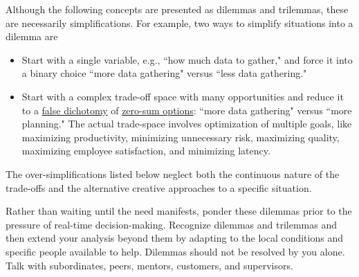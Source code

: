 Although the following concepts are presented as dilemmas and trilemmas, these are necessarily simplifications. For example, two ways to simplify situations into a dilemma are
\begin{itemize}
    \item Start with a single variable, e.g., ``how much data to gather," and force it into a binary choice ``more data gathering" versus ``less data gathering."
    
    \item Start with a complex trade-off space with many opportunities and reduce it to a \href{https://en.wikipedia.org/wiki/False_dilemma}{false dichotomy} 
    \iftoggle{WPinmargin}{ \marginpar{[Wikipedia] False\\dilemma}}{}
    of 
    \href{https://en.wikipedia.org/wiki/Zero-sum_thinking}{zero-sum options}: 
    ``more data gathering" versus ``more planning." The actual trade-space involves optimization of multiple goals, like maximizing productivity, minimizing unnecessary risk, maximizing quality, maximizing employee satisfaction, and minimizing latency. 
\end{itemize}
The over-simplifications listed below neglect both the continuous nature of the trade-offs and the alternative creative approaches to a specific situation. 





Rather than waiting until the need manifests, ponder these dilemmas prior to the pressure of real-time decision-making.  Recognize dilemmas and trilemmas and then extend your analysis beyond them by adapting to the local conditions and specific people available to help.
Dilemmas should not be resolved by you alone. Talk with subordinates, peers, mentors, customers, and supervisors.


